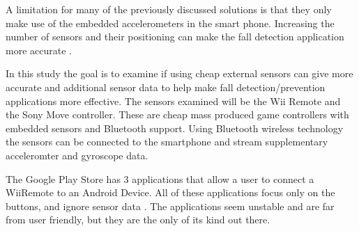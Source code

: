 A limitation for many of the previously discussed solutions is that they only make use of the embedded accelerometers in the smart phone. Increasing the number of sensors and their positioning can make the fall detection application more accurate \cite{fallDetectionWithExtraSensors}.

In this study the goal is to examine if using cheap external sensors can give more accurate and additional sensor data to help make fall detection/prevention applications more effective. The sensors examined will be the Wii Remote and the Sony Move controller. These are cheap mass produced game controllers with embedded sensors and Bluetooth support. Using Bluetooth wireless technology the sensors can be connected to the smartphone and stream supplementary acceleromter and gyroscope data.

The Google Play Store has 3 applications that allow a user to connect a WiiRemote to an Android Device. All of these applications focus only on the buttons, and ignore sensor data \cite{wiimoteController, simpleWiiController}. The applications seem unstable and are far from user friendly, but they are the only of its kind out there.

